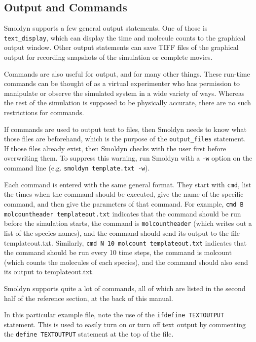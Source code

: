 \documentclass {scrbook}
\newcommand {\ttt} {\texttt}
\begin{document}
\subsection*{Output and Commands}

Smoldyn supports a few general output statements. One of those is  \ttt{text\_display}, which can display the time and molecule counts to the graphical output window. Other output statements can save TIFF files of the graphical output for recording snapshots of the simulation or complete movies.

Commands are also useful for output, and for many other things. These run-time commands can be thought of as a virtual experimenter who has permission to manipulate or observe the simulated system in a wide variety of ways. Whereas the rest of the simulation is supposed to be physically accurate, there are no such restrictions for commands.

If commands are used to output text to files, then Smoldyn needs to know what those files are beforehand, which is the purpose of the  \ttt{output\_files} statement. If those files already exist, then Smoldyn checks with the user first before overwriting them. To suppress this warning, run Smoldyn with a  \ttt{-w} option on the command line (e.g.  \ttt{smoldyn template.txt -w}).

Each command is entered with the same general format. They start with  \ttt{cmd}, list the times when the command should be executed, give the name of the specific command, and then give the parameters of that command. For example,  \ttt{cmd B molcountheader templateout.txt} indicates that the command should be run before the simulation starts, the command is  \ttt{molcountheader} (which writes out a list of the species names), and the command should send its output to the file templateout.txt. Similarly,  \ttt{cmd N 10 molcount templateout.txt} indicates that the command should be run every 10 time steps, the command is molcount (which counts the molecules of each species), and the command should also send its output to templateout.txt.

Smoldyn supports quite a lot of commands, all of which are listed in the second half of the reference section, at the back of this manual.

In this particular example file, note the use of the  \ttt{ifdefine TEXTOUTPUT} statement. This is used to easily turn on or turn off text output by commenting the  \ttt{define TEXTOUTPUT} statement at the top of the file.
\end{document}
